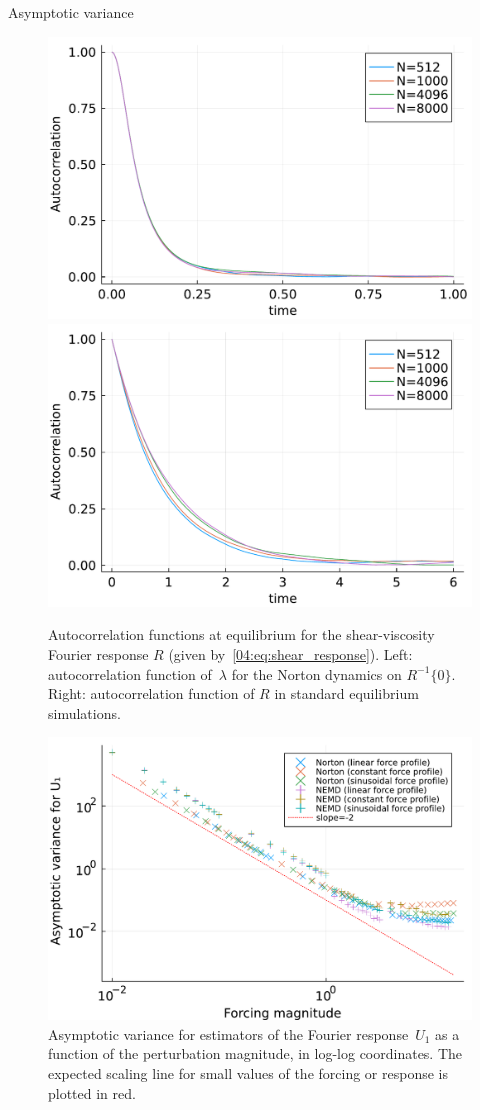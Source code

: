 \begin{subsection}{Asymptotic variance}
    \begin{figure}
        \centering
        \includegraphics[width=0.49\linewidth]{figures/04/ac_eq_norton.pdf}
        \includegraphics[width=0.49\linewidth]{figures/04/ac_eq_thevenin.pdf}
        \caption[]{Autocorrelation functions at equilibrium for the shear-viscosity Fourier response $R$ (given by~\eqref{04:eq:shear_response}). Left: autocorrelation function of~$\lambda$ for the Norton dynamics on $R^{-1}\{0\}$. Right: autocorrelation function of $R$ in standard equilibrium simulations.}
        \label{04:fig:shear_acs}
    \end{figure}

    \begin{figure}
        \centering
        \includegraphics[width=0.8\linewidth]{figures/04/norton_full_avs.pdf}
        \caption[]{Asymptotic variance for estimators of the Fourier response~$U_1$ as a function of the perturbation magnitude, in log-log coordinates. The expected scaling line for small values of the forcing or response is plotted in red. }
        \label{04:fig:sv_avs}
    \end{figure}
    
    \end{subsection}
    
